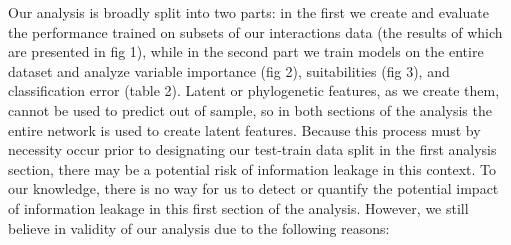 \documentclass{article}
\begin{document}
Our analysis is broadly split into two parts: in the first we create and evaluate the performance trained on subsets of our interactions data (the results of which are presented in fig 1), while in the second part we train models on the entire dataset and analyze variable importance (fig 2), suitabilities (fig 3), and classification error (table 2). Latent or phylogenetic features, as we create them, cannot be used to predict out of sample, so in both sections of the analysis the entire network is used to create latent features. Because this process must by necessity occur prior to designating our test-train data split in the first analysis section, there may be a potential risk of information leakage in this context. To our knowledge, there is no way for us to detect or quantify the potential impact of information leakage in this first section of the analysis. However, we still believe in validity of our analysis due to the following reasons: 
\end{document}
